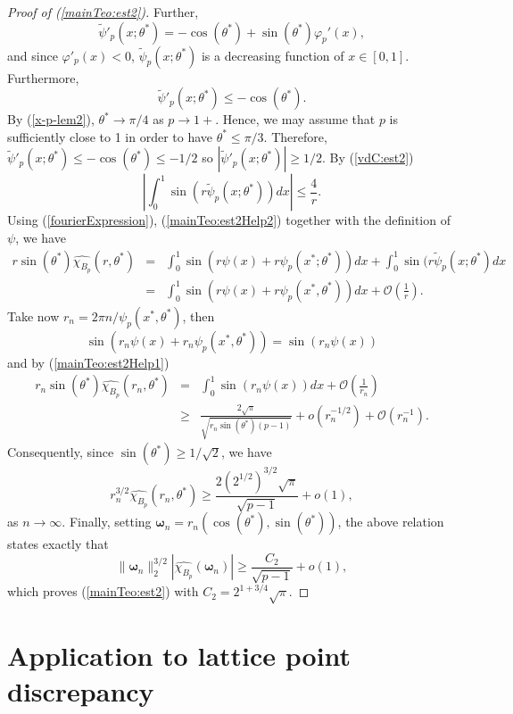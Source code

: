 \documentclass{amsart}
\numberwithin{equation}{section}
\begin{document}
\begin{proof}[Proof of (\ref{mainTeo:est2})]
Further, 
$$
\widetilde{\psi}'_p(x;\theta^*)=-\cos(\theta^*)+\sin(\theta^*)\varphi_p'(x),
$$
and since $\varphi'_p(x)<0$, $\widetilde{\psi}_p(x;\theta^*)$ is a decreasing function of $x\in[0,1]$. Furthermore,
$$
\widetilde{\psi}'_p(x;\theta^*)\le-\cos(\theta^*).
$$
By (\ref{x-p-lem2}), $\theta^*\rightarrow\pi/4$ as $p\rightarrow1+$. Hence, we may assume that $p$ is sufficiently close to 1 in order to have $\theta^*\le\pi/3$. Therefore, $\widetilde{\psi}'_p(x;\theta^*)\le-\cos(\theta^*)\le-1/2$ so $|\widetilde{\psi}'_p(x;\theta^*)|\ge1/2$. By (\ref{vdC:est2})
\begin{equation}
    \label{mainTeo:est2Help2}
    \left|\int_0^1\sin(r\widetilde{\psi}_p(x;\theta^*))dx\right|\le\frac{4}{r}.
\end{equation}
Using (\ref{fourierExpression}), (\ref{mainTeo:est2Help2}) together with the definition of $\psi$, we have
\begin{eqnarray}
\nonumber
r\sin(\theta^*)\widehat{\chi_{B_p}}(r,\theta^*)&=&\int_0^1\sin(r\psi(x)+r\psi_p(x^*;\theta^*))dx
+\int_0^1\sin(r\widetilde{\psi}_p(x;\theta^*)dx\\
\nonumber
&=&\int_0^1\sin(r\psi(x)+r\psi_p(x^*,\theta^*))dx+\mathcal{O}\left(\frac{1}{r}\right).
\end{eqnarray}
Take now $r_n=2\pi n/\psi_p(x^*,\theta^*)$, then
$$
\sin(r_n\psi(x)+r_n\psi_p(x^*,\theta^*))=\sin(r_n\psi(x))
$$
and by (\ref{mainTeo:est2Help1})
\begin{eqnarray}
\nonumber
r_n\sin(\theta^*)\widehat{\chi_{B_p}}(r_n,\theta^*)&=&\int_0^1\sin(r_n\psi(x))dx+\mathcal{O}\left(\frac{1}{r_n}\right)\\
\nonumber
&\ge&\frac{2\sqrt{\pi}}{\sqrt{r_n\sin(\theta^*)(p-1)}}+o(r_n^{-1/2})+\mathcal{O}(r_n^{-1}).
\end{eqnarray}
Consequently, since $\sin(\theta^*)\ge1/\sqrt{2}$, we have
$$
r_n^{3/2}\widehat{\chi_{B_p}}(r_n,\theta^*)\ge\frac{2(2^{1/2})^{3/2}\sqrt{\pi}}{\sqrt{p-1}}+o(1),
$$
as $n\rightarrow\infty$.
Finally, setting $\boldsymbol{\omega}_n=r_n(\cos(\theta^*),\sin(\theta^*))$, the above relation states exactly that
$$
\|\boldsymbol{\omega}_n\|_2^{3/2}|\widehat{\chi_{B_p}}(\boldsymbol{\omega}_n)|\ge\frac{C_2}{\sqrt{p-1}}+o(1),
$$
which proves (\ref{mainTeo:est2}) with $C_2=2^{1+3/4}\sqrt{\pi}$.
\end{proof}


\section{Application to lattice point discrepancy}
\end{document}
